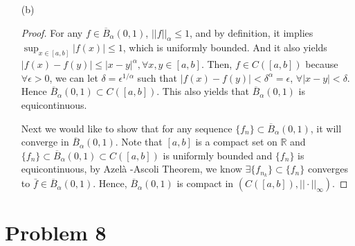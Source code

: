 \documentclass[12pt]{article}
\begin{document}
\begin{enumerate}
\begin{proof}
In conclusion, $\left(C^{\alpha} ([a, b]), ||\cdot||_\alpha\right)$ is a normed vector space.

\end{proof}



\item [(b)]

\begin{proof}

For any $f\in \overline{B}_\alpha(0, 1)$, $||f||_\alpha \leqslant 1$, and by definition, it implies $\sup_{x\in[a, b]}|f(x)| \leqslant 1$, which is uniformly bounded. And it also yields $|f(x) - f(y)| \leqslant |x-y|^\alpha, \forall x,y \in [a, b]$. Then, $f\in C([a, b])$ because $\forall \epsilon > 0$, we can let $\delta = \epsilon^{1/\alpha}$ such that $|f(x) - f(y)|< \delta^{\alpha} = \epsilon$, $\forall |x- y|<\delta$. Hence $\overline{B}_\alpha(0, 1) \subset C([a, b])$. This also yields that $\overline{B}_\alpha(0, 1)$ is equicontinuous.

Next we would like to show that for any sequence $\{f_n\}\subset \overline{B}_\alpha(0, 1)$, it will converge in $\overline{B}_\alpha(0, 1)$. Note that $[a, b]$ is a compact set on $\mathbb R$ and $\{f_n\}\subset \overline{B}_\alpha(0, 1)\subset C([a,b])$ is uniformly bounded and $\{f_n\}$ is equicontinuous, by Azel\`a -Ascoli Theorem, we know $\exists \{f_{n_k}\}\subset \{f_n\}$ converges to $\bar f \in \overline{B}_\alpha(0, 1)$. Hence, $\overline{B}_\alpha(0, 1)$ is compact in $\left(C([a, b]), ||\cdot||_\infty  \right)$.







\end{proof}



\end{enumerate}




\section*{Problem 8}
\end{document}

